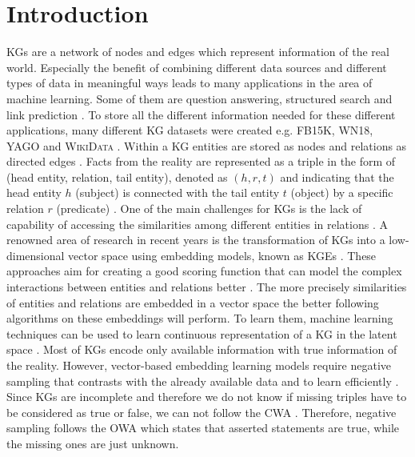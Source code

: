 \chapter{Introduction}
\label{ch:introduction}

\acp{KG} are a network of nodes and edges which represent information of the real world. 
Especially the benefit of combining different data sources and different types of data in meaningful ways leads to many applications in the area of machine learning.
Some of them are question answering, structured search \cite{zhang2019nscaching} and link prediction \cite{cai2017kbgan, Alam2020AffinityDN}.
To store all the different information needed for these different applications, many different \ac{KG} datasets were created e.g. \textsc{FB15K}, \textsc{WN18}, \textsc{YAGO} \cite{ConEx} and \textsc{WikiData} \cite{arnaoutwikinegata}.
Within a \ac{KG} entities are stored as nodes and relations as directed edges \cite{zhang2019nscaching}.
Facts from the reality are represented as a triple in the form of (head entity, relation, tail entity), denoted as $(h, r, t)$ and indicating that the head entity $h$ (subject) is connected with the tail entity $t$ (object) by a specific relation $r$ (predicate) \cite{zhang2019nscaching, Alam2020AffinityDN}.
One of the main challenges for \acp{KG} is the lack of capability of accessing the similarities among different entities in relations \cite{cai2017kbgan}. 
A renowned area of research in recent years is the transformation of \acp{KG} into a low-dimensional vector space using embedding models, known as \acp{KGE} \cite{Alam2020AffinityDN}.
These approaches aim for creating a good scoring function that can model the complex interactions between entities and relations better \cite{zhang2019nscaching}.
The more precisely similarities of entities and relations are embedded in a vector space the better following algorithms on these embeddings will perform.
To learn them, machine learning techniques can be used to learn continuous representation of a \ac{KG} in the latent space \cite{cai2017kbgan}. 
Most of \acp{KG} encode only available information with true information of the reality.
However, vector-based embedding learning models require negative sampling that contrasts with the already available data and to learn efficiently \cite{Alam2020AffinityDN}.
Since \acp{KG} are incomplete and therefore we do not know if missing triples have to be considered as true or false, we can not follow the \ac{CWA} \cite{arnaout2020enriching}.
Therefore, negative sampling follows the \ac{OWA} which states that asserted statements are true, while the missing ones are just unknown.

